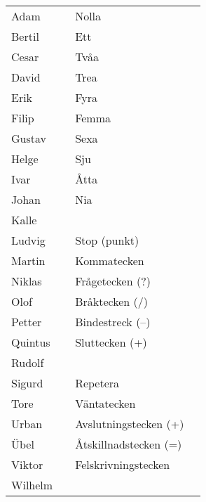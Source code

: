 \begin{table}[H]
\centering
\small
\begin{tabular}{llll}
	Adam    & \MAdam    & Nolla                 & \MNoll         \\
	Bertil  & \MBertil  & Ett                   & \MEtt          \\
	Cesar   & \MCesar   & Tvåa                  & \MTva          \\
	David   & \MDavid   & Trea                  & \MTre          \\
	Erik    & \MErik    & Fyra                  & \MFyra         \\
	Filip   & \MFilip   & Femma                 & \MFem          \\
	Gustav  & \MGustav  & Sexa                  & \MSex          \\
	Helge   & \MHelge   & Sju                   & \MSju          \\
	Ivar    & \MIvar    & Åtta                  & \MAtta         \\
	Johan   & \MJohan   & Nia                   & \MNio          \\
	Kalle   & \MKalle   &                       &                \\
	Ludvig  & \MLudvig  & Stop (punkt)          & \MSTOP         \\
	Martin  & \MMartin  & Kommatecken           & \MKomma        \\
	Niklas  & \MNiklas  & Frågetecken (?)       & \MFragetecken  \\
	Olof    & \MOlof    & Bråktecken (/)        & \MBraktecken   \\
	Petter  & \MPetter  & Bindestreck (--)      & \MBindestreck  \\
	Quintus & \MQvintus & Sluttecken (+)        & \MSluttecken   \\
	Rudolf  & \MRudolf  &                       &                \\
	Sigurd  & \MSigurd  & Repetera              & \MRepetera     \\
	Tore    & \MTore    & Väntatecken           & \MVanta        \\
	Urban   & \MUrban   & Avslutningstecken (+) & \MAvslutning   \\
	Übel    & \MUbel    & Åtskillnadstecken (=) & \MAtskillnad   \\
	Viktor  & \MViktor  & Felskrivningstecken   & \MFelskrivning \\
	Wilhelm & \MWilhelm &                       &                \\

\end{tabular}
\end{table}
